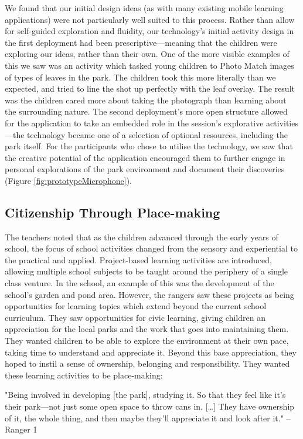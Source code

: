 We found that our initial design ideas (as with many existing mobile learning applications) were not particularly well suited to this process. Rather than allow for self-guided exploration and fluidity, our technology’s initial activity design in the first deployment had been prescriptive—meaning that the children were exploring our ideas, rather than their own. One of the more visible examples of this we saw was an activity which tasked young children to Photo Match images of types of leaves in the park. The children took this more literally than we expected, and tried to line the shot up perfectly with the leaf overlay. The result was the children cared more about taking the photograph than learning about the surrounding nature. The second deployment’s more open structure allowed for the application to take an embedded role in the session’s explorative activities—the technology became one of a selection of optional resources, including the park itself. For the participants who chose to utilise the technology, we saw that the creative potential of the application encouraged them to further engage in personal explorations of the park environment and document their discoveries (Figure \ref{fig:prototypeMicrophone}).

\subsection{Citizenship Through Place-making}

The teachers noted that as the children advanced through the early years of school, the focus of school activities changed from the sensory and experiential to the practical and applied. Project-based learning activities are introduced, allowing multiple school subjects to be taught around the periphery of a single class venture. In the school, an example of this was the development of the school’s garden and pond area. However, the rangers saw these projects as being opportunities for learning topics which extend beyond the current school curriculum.  They saw opportunities for civic learning, giving children an appreciation for the local parks and the work that goes into maintaining them. They wanted children to be able to explore the environment at their own pace, taking time to understand and appreciate it. Beyond this base appreciation, they hoped to instil a sense of ownership, belonging and responsibility. They wanted these learning activities to be place-making:

\begin{displayquote}
"Being involved in developing [the park], studying it. So that they feel like it's their park---not just some open space to throw cans in. […] They have ownership of it, the whole thing, and then maybe they’ll appreciate it and look after it." – Ranger 1
\end{displayquote}

